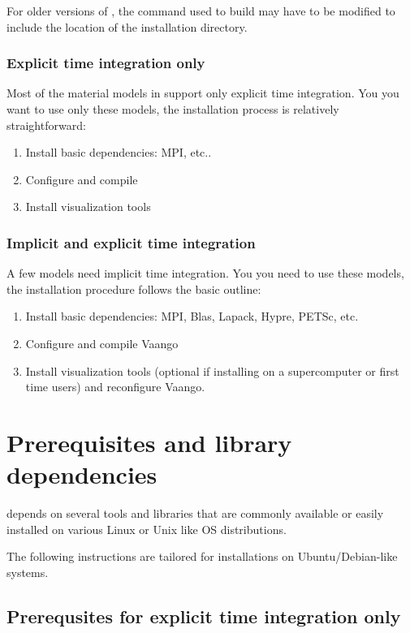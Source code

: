 \documentclass[11pt,fleqn]{book} %
\begin{document}
For older versions of \Visit, the  command used to
build \Vaango may have to be modified to include the location of 
the \Visit installation directory.  

\subsection{Explicit time integration only}
Most of the material models in \Vaango support only explicit time
integration.  You you want to use only these models, the installation 
process is relatively straightforward:
\begin{enumerate}
\item Install basic dependencies: MPI, etc..
\item Configure and compile \Vaango
\item Install visualization tools 
\end{enumerate}

\subsection{Implicit and explicit time integration}
A few \Vaango models need implicit time integration.  You you need to use these
models, the installation procedure follows the basic outline:
\begin{enumerate}
\item Install basic dependencies: MPI, Blas, Lapack, Hypre, PETSc, etc.
\item Configure and compile Vaango
\item Install visualization tools (optional if installing on a
  supercomputer or first time users) and reconfigure Vaango.
\end{enumerate}

\chapter{Prerequisites and library dependencies}
\Vaango depends on several tools and libraries that are
commonly available or easily installed on various Linux or Unix like
OS distributions.  

\begin{WarningBox}
The following instructions are tailored for installations on Ubuntu/Debian-like systems.
\end{WarningBox}

\section{Prerequsites for explicit time integration only}
\end{document}
